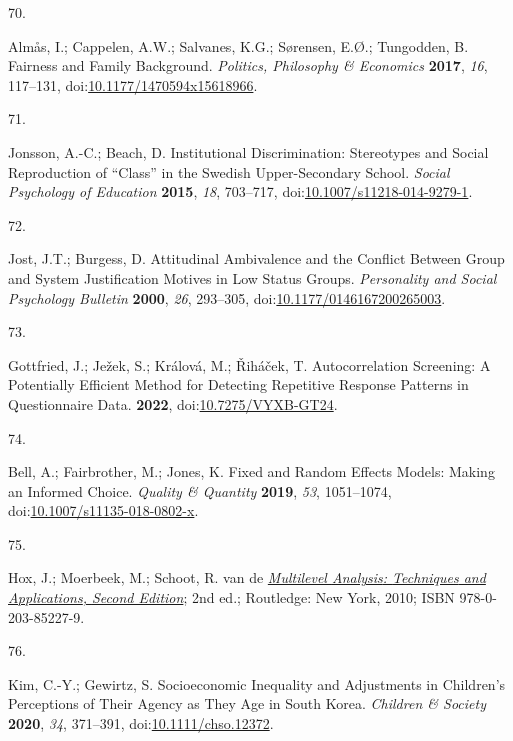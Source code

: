\documentclass[
  12pt,
  letterpaper,
]{article}
\newlength{\cslhangindent}
\newlength{\csllabelwidth}
\newenvironment{CSLReferences}[2] %
 {\begin{list}{}{%
  \setlength{\itemindent}{0pt}
  \setlength{\leftmargin}{0pt}
  \setlength{\parsep}{0pt}
  \ifodd #1
   \setlength{\leftmargin}{\cslhangindent}
   \setlength{\itemindent}{-1\cslhangindent}
  \fi
  \setlength{\itemsep}{#2\baselineskip}}}
 {\end{list}}
\newcommand{\CSLLeftMargin}[1]{\parbox[t]{\csllabelwidth}{\strut#1\strut}}
\newcommand{\CSLRightInline}[1]{\parbox[t]{\linewidth - \csllabelwidth}{\strut#1\strut}}
\begin{document}
\begin{CSLReferences}{0}{0}
\CSLLeftMargin{70. }%
\CSLRightInline{Almås, I.; Cappelen, A.W.; Salvanes, K.G.; Sørensen,
E.Ø.; Tungodden, B. Fairness and Family Background. \emph{Politics,
Philosophy \& Economics} \textbf{2017}, \emph{16}, 117--131,
doi:\href{https://doi.org/10.1177/1470594x15618966}{10.1177/1470594x15618966}.}

\CSLLeftMargin{71. }%
\CSLRightInline{Jonsson, A.-C.; Beach, D. Institutional Discrimination:
{Stereotypes} and Social Reproduction of {``Class''} in the {Swedish}
Upper-Secondary School. \emph{Social Psychology of Education}
\textbf{2015}, \emph{18}, 703--717,
doi:\href{https://doi.org/10.1007/s11218-014-9279-1}{10.1007/s11218-014-9279-1}.}

\CSLLeftMargin{72. }%
\CSLRightInline{Jost, J.T.; Burgess, D. Attitudinal {Ambivalence} and
the {Conflict} Between {Group} and {System Justification Motives} in
{Low Status Groups}. \emph{Personality and Social Psychology Bulletin}
\textbf{2000}, \emph{26}, 293--305,
doi:\href{https://doi.org/10.1177/0146167200265003}{10.1177/0146167200265003}.}

\CSLLeftMargin{73. }%
\CSLRightInline{Gottfried, J.; Ježek, S.; Králová, M.; Řiháček, T.
Autocorrelation {Screening}: {A Potentially Efficient Method} for
{Detecting Repetitive Response Patterns} in {Questionnaire Data}.
\textbf{2022},
doi:\href{https://doi.org/10.7275/VYXB-GT24}{10.7275/VYXB-GT24}.}

\CSLLeftMargin{74. }%
\CSLRightInline{Bell, A.; Fairbrother, M.; Jones, K. Fixed and Random
Effects Models: Making an Informed Choice. \emph{Quality \& Quantity}
\textbf{2019}, \emph{53}, 1051--1074,
doi:\href{https://doi.org/10.1007/s11135-018-0802-x}{10.1007/s11135-018-0802-x}.}

\CSLLeftMargin{75. }%
\CSLRightInline{Hox, J.; Moerbeek, M.; Schoot, R. van de
\emph{\href{https://doi.org/10.4324/9780203852279}{Multilevel
{Analysis}: {Techniques} and {Applications}, {Second Edition}}}; 2nd
ed.; Routledge: New York, 2010; ISBN 978-0-203-85227-9.}

\CSLLeftMargin{76. }%
\CSLRightInline{Kim, C.-Y.; Gewirtz, S. Socioeconomic Inequality and
Adjustments in Children's Perceptions of Their Agency as They Age in
{South Korea}. \emph{Children \& Society} \textbf{2020}, \emph{34},
371--391,
doi:\href{https://doi.org/10.1111/chso.12372}{10.1111/chso.12372}.}


\end{CSLReferences}
\end{document}
